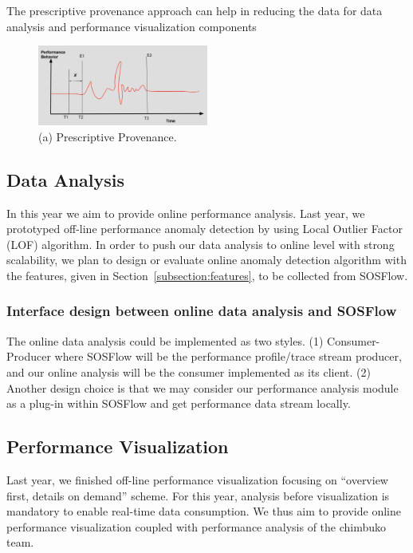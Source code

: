 The prescriptive provenance approach can help in reducing the data for data analysis and performance  visualization components

\begin{figure}[th!]
 \centering
  \includegraphics[width=0.5\textwidth]{Figs/Provenance}
 \caption{(a) Prescriptive Provenance.}
\label{designfig:2}     
 \end{figure}


\subsection{Data Analysis}
In this year we aim to provide online performance analysis. Last year, we prototyped off-line performance anomaly detection by using Local Outlier Factor (LOF) algorithm. In order to push our data analysis to online level with strong scalability, we plan to design or evaluate online anomaly detection algorithm  with the features, given in Section~\ref{subsection:features}, to be collected from SOSFlow.

\subsubsection{Interface design between online data analysis and SOSFlow}
The online data analysis could be implemented as two styles. (1) Consumer-Producer where SOSFlow will be the performance profile/trace stream producer, and our online analysis will be the consumer implemented as its client. (2) Another design choice is that we may consider our performance analysis module as a plug-in within SOSFlow and get performance data stream locally.
\subsection{Performance Visualization}
Last year, we finished off-line performance visualization focusing on ``overview first, details on demand'' scheme. For this year, analysis before visualization is mandatory to enable real-time data consumption. We thus aim to provide online performance visualization coupled with performance analysis of the chimbuko team.


